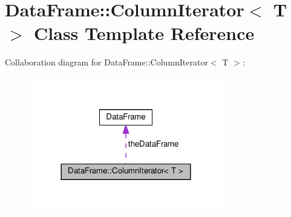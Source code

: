 \hypertarget{classDataFrame_1_1ColumnIterator}{}\section{Data\+Frame\+:\+:Column\+Iterator$<$ T $>$ Class Template Reference}
\label{classDataFrame_1_1ColumnIterator}


Collaboration diagram for Data\+Frame\+:\+:Column\+Iterator$<$ T $>$\+:\nopagebreak
\begin{figure}[H]
\begin{center}
\leavevmode
\includegraphics[width=240pt]{classDataFrame_1_1ColumnIterator__coll__graph}
\end{center}
\end{figure}
